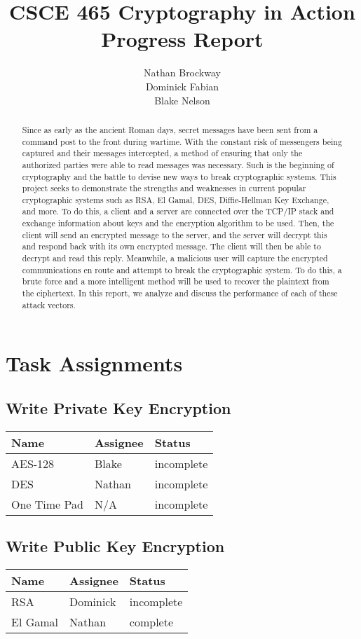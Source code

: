 \documentclass[12pt]{report}
\title{CSCE 465 Cryptography in Action Progress Report}
\author{Nathan Brockway\\Dominick Fabian\\Blake Nelson}
\begin{document}
\maketitle

\begin{abstract}
    Since as early as the ancient Roman days, secret messages have been sent from a command post to the front during wartime. With the constant risk of messengers being captured and their messages intercepted, a method of ensuring that only the authorized parties were able to read messages was necessary. Such is the beginning of cryptography and the battle to devise new ways to break cryptographic systems. This project seeks to demonstrate the strengths and weaknesses in current popular cryptographic systems such as RSA, El Gamal, DES, Diffie-Hellman Key Exchange, and more. To do this, a client and a server are connected over the TCP/IP stack and exchange information about keys and the encryption algorithm to be used. Then, the client will send an encrypted message to the server, and the server will decrypt this and respond back with its own encrypted message. The client will then be able to decrypt and read this reply. Meanwhile, a malicious user will capture the encrypted communications en route and attempt to break the cryptographic system. To do this, a brute force and a more intelligent method will be used to recover the plaintext from the ciphertext. In this report, we analyze and discuss the performance of each of these attack vectors.
\end{abstract}

\section{Task Assignments}
\subsection{Write Private Key Encryption}
\begin{tabular}{l|l|l}
    Name & Assignee & Status \\ \hline
    AES-128 & Blake & incomplete \\
    DES & Nathan & incomplete \\
    One Time Pad & N/A & incomplete	 
\end{tabular}

\subsection{Write Public Key Encryption}
\begin{tabular}{l|l|l}
    Name & Assignee & Status \\ \hline
    RSA & Dominick & incomplete \\
    El Gamal & Nathan & complete
\end{tabular}
\end{document}

